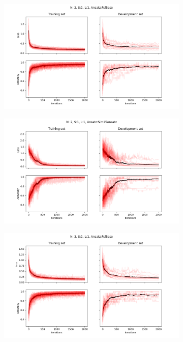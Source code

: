 \begin{figure}
\centering
\begin{subfigure}[b]{.49\textwidth}
    \centering
    \includegraphics[width=\textwidth]{figures/single_model/FslBase/Epochs_2000--A_0.05--N_2--S_1--L_1--Ansatz_FslBase.png}
\end{subfigure}
\begin{subfigure}[b]{.49\textwidth}
    \centering
    \includegraphics[width=\textwidth]{figures/single_model/Sim15Ansatz/Epochs_2000--A_0.05--N_2--S_1--L_1.png}
\end{subfigure}
\begin{subfigure}[b]{.49\textwidth}
    \centering
    \includegraphics[width=\textwidth]{figures/single_model/FslBase/Epochs_2000--A_0.05--N_3--S_1--L_1--Ansatz_FslBase.png}

\end{subfigure}
\end{figure}
